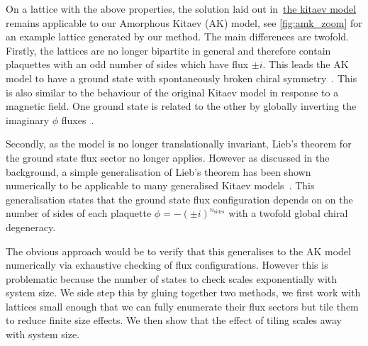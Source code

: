 On a lattice with the above properties, the solution laid out in~\protect\hyperlink{bg-hkm-model}{the kitaev model} remains applicable to our Amorphous Kitaev (AK) model, see \cref{fig:amk_zoom} for an example lattice generated by our method. The main differences are twofold. Firstly, the lattices are no longer bipartite in general and therefore contain plaquettes with an odd number of sides which have flux \(\pm i\). This leads the AK model to have a ground state with spontaneously broken chiral symmetry~\autocite{Chua2011,yaoExactChiralSpin2007,ChuaPRB2011,Fiete2012,Natori2016,Wu2009,Peri2020,WangHaoranPRB2021}. This is also similar to the behaviour of the original Kitaev model in response to a magnetic field. One ground state is related to the other by globally inverting the imaginary \(\phi\) fluxes~\autocite{yaoExactChiralSpin2007}.

Secondly, as the model is no longer translationally invariant, Lieb's theorem for the ground state flux sector no longer applies. However as discussed in the background, a simple generalisation of Lieb's theorem has been shown numerically to be applicable to many generalised Kitaev models~\autocite{eschmannThermodynamicClassificationThreedimensional2020,Yao2009,eschmann2019thermodynamics,Peri2020}. This generalisation states that the ground state flux configuration depends on on the number of sides of each plaquette \(\phi = -(\pm i)^{n_{\mathrm{sides}}}\) with a twofold global chiral degeneracy.

The obvious approach would be to verify that this generalises to the AK model numerically via exhaustive checking of flux configurations. However this is problematic because the number of states to check scales exponentially with system size. We side step this by gluing together two methods, we first work with lattices small enough that we can fully enumerate their flux sectors but tile them to reduce finite size effects. We then show that the effect of tiling scales away with system size.

